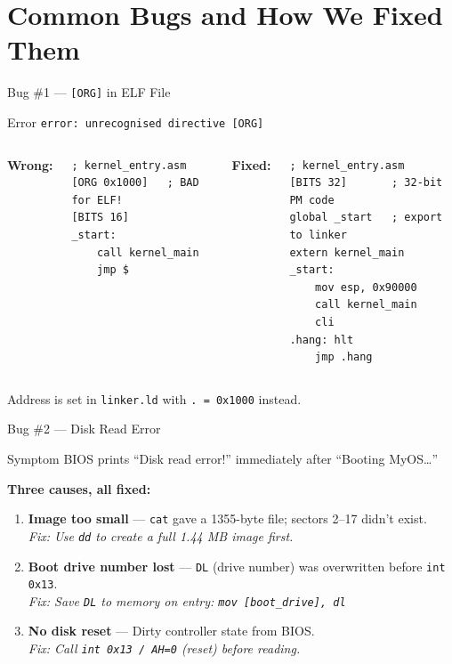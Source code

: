 \documentclass[aspectratio=169]{beamer}
\begin{document}
\section{Common Bugs and How We Fixed Them}

\begin{frame}[fragile]{Bug \#1 --- \texttt{[ORG]} in ELF File}
  \begin{alertblock}{Error}
    \texttt{error: unrecognised directive [ORG]}
  \end{alertblock}
  \vspace{6pt}
  \begin{columns}[T]
    \textbf{Wrong:}
    \begin{lstlisting}[style=asm]
; kernel_entry.asm
[ORG 0x1000]   ; BAD for ELF!
[BITS 16]
_start:
    call kernel_main
    jmp $
    \end{lstlisting}
    \textbf{Fixed:}
    \begin{lstlisting}[style=asm]
; kernel_entry.asm
[BITS 32]       ; 32-bit PM code
global _start   ; export to linker
extern kernel_main
_start:
    mov esp, 0x90000
    call kernel_main
    cli
.hang: hlt
    jmp .hang
    \end{lstlisting}
  \end{columns}
  \vspace{4pt}
  Address is set in \texttt{linker.ld} with \texttt{. = 0x1000} instead.
\end{frame}

\begin{frame}{Bug \#2 --- Disk Read Error}
  \begin{alertblock}{Symptom}
    BIOS prints ``Disk read error!'' immediately after ``Booting MyOS\ldots''
  \end{alertblock}
  \vspace{4pt}
  \textbf{Three causes, all fixed:}
  \begin{enumerate}
    \item \textbf{Image too small} --- \texttt{cat} gave a 1355-byte file; sectors 2--17 didn't exist.\\
      \textit{Fix: Use \texttt{dd} to create a full 1.44 MB image first.}
    \item \textbf{Boot drive number lost} --- \texttt{DL} (drive number) was overwritten before \texttt{int 0x13}.\\
      \textit{Fix: Save \texttt{DL} to memory on entry: \texttt{mov [boot\_drive], dl}}
    \item \textbf{No disk reset} --- Dirty controller state from BIOS.\\
      \textit{Fix: Call \texttt{int 0x13 / AH=0} (reset) before reading.}
  \end{enumerate}
\end{frame}
\end{document}
